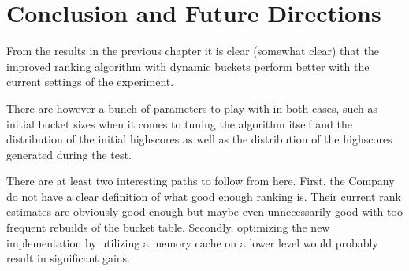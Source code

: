 \chapter{Conclusion and Future Directions}

From the results in the previous chapter it is clear (somewhat clear) that the improved ranking algorithm with dynamic buckets perform better with the current settings of the experiment.

There are however a bunch of parameters to play with in both cases, such as initial bucket sizes when it comes to tuning the algorithm itself and the distribution of the initial highscores as well as the distribution of the highscores generated during the test.

There are at least two interesting paths to follow from here. First, the Company do not have a clear definition of what good enough ranking is. Their current rank estimates are obviously good enough but maybe even unnecessarily good with too frequent rebuilds of the bucket table. Secondly, optimizing the new implementation by utilizing a memory cache on a lower level would probably result in significant gains.


